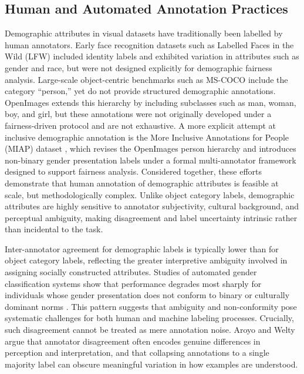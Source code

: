 \subsection{Human and Automated Annotation Practices}
Demographic attributes in visual datasets have traditionally been labelled by human annotators. Early face recognition datasets such as Labelled Faces in the Wild (LFW) \cite{Huang_2007_LFW} included identity labels and exhibited variation in attributes such as gender and race, but were not designed explicitly for demographic fairness analysis. Large-scale object-centric benchmarks such as MS-COCO \cite{Lin_2014_COCO} include the category “person,” yet do not provide structured demographic annotations. OpenImages \cite{Kuznetsova_2020_OpenImagesV4} extends this hierarchy by including subclasses such as man, woman, boy, and girl, but these annotations were not originally developed under a fairness-driven protocol and are not exhaustive. A more explicit attempt at inclusive demographic annotation is the More Inclusive Annotations for People (MIAP) dataset \cite{Schumann_2021_StepInclusivePeopleAnnotations}, which revises the OpenImages person hierarchy and introduces non-binary gender presentation labels under a formal multi-annotator framework designed to support fairness analysis. Considered together, these efforts demonstrate that human annotation of demographic attributes is feasible at scale, but methodologically complex. Unlike object category labels, demographic attributes are highly sensitive to annotator subjectivity, cultural background, and perceptual ambiguity, making disagreement and label uncertainty intrinsic rather than incidental to the task.

Inter-annotator agreement for demographic labels is typically lower than for object category labels, reflecting the greater interpretive ambiguity involved in assigning socially constructed attributes. Studies of automated gender classification systems show that performance degrades most sharply for individuals whose gender presentation does not conform to binary or culturally dominant norms \cite{Scheuerman_2019_HowComputersSeeGender}. This pattern suggests that ambiguity and non-conformity pose systematic challenges for both human and machine labeling processes. Crucially, such disagreement cannot be treated as mere annotation noise. Aroyo and Welty \cite{Aroyo_2015_CrowdTruth} argue that annotator disagreement often encodes genuine differences in perception and interpretation, and that collapsing annotations to a single majority label can obscure meaningful variation in how examples are understood.

